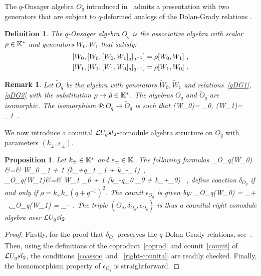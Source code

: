 \documentclass[11pt]{amsart}
\numberwithin{equation}{section}
\newtheorem{prop}[thm]{Proposition}
\newtheorem{defn}[thm]{Definition}
\newtheorem{rem}[thm]{Remark}
\numberwithin{equation}{section}
\begin{document}
The $q$-Onsager algebra $O_q$ introduced in~\cite{Ter93,Ter03,BK05} admits a presentation with two generators that are subject to $q$-deformed analogs of the Dolan-Grady relations \cite{DG}.
\begin{defn}\label{def:Oq} The $q$-Onsager algebra ${O}_q$ is the associative algebra with scalar $\rho\in{\mathbb{K}}^*$ and generators $W_0,W_1$ that satisfy:
\begin{align} \label{qDG1}
	\lbrack  {\normalfont W}_0, \lbrack {\normalfont W}_0, \lbrack {\normalfont W}_0, {\normalfont W}_1\rbrack_q \rbrack_{q^{-1}} \rbrack &=\rho \lbrack {\normalfont W}_0, {\normalfont W}_1 \rbrack\ ,\\ \label{qDG2}
	\lbrack {\normalfont W}_1, \lbrack {\normalfont W}_1, \lbrack {\normalfont W}_1, {\normalfont W}_0\rbrack_q \rbrack_{q^{-1}}\rbrack &= \rho  \lbrack {\normalfont W}_1, {\normalfont W}_0 \rbrack\ .
\end{align}   
\end{defn}
\begin{rem} Let $\tilde{O}_q$ be the algebra with generators $\tilde{W}_0,\tilde{W}_1$ and relations~\eqref{qDG1}, \eqref{qDG2} with the substitution $\rho \rightarrow \tilde\rho\in{\mathbb{K}}^*$.
The algebras $O_q$ and $\tilde O_q$  are isomorphic. The isomorphism $\Psi\colon O_q \rightarrow \tilde{O}_q$ is such that 
\beqa\label{eq:Psi}
\Psi(W_0)= \sqrt{\frac{\rho}{\tilde\rho}}_0, \qquad
\Psi(W_1)= \sqrt{\frac{\rho}{\tilde\rho}}_1\ .
\eeqa
\end{rem}

We now introduce  
a counital $\mathcal{L} U_q sl_2$-comodule algebra structure on $O_q$ with  parameters $(k_\pm,\varepsilon_\pm)$.


\begin{prop}\label{prop:coact} Let $k_\pm\in\mathbb{K}^*$ and $\varepsilon_\pm\in\mathbb{K}$. 
The following formulas
\beqa
	\delta_{O_q}(W_0) &=& W_0 \otimes \tk_1 + 1 \otimes (k_+q\te_1 \tk_1 + k_-\tf_1)\ ,\label{eq:del1}\\
	\delta_{O_q}(W_1)&=& W_1 \otimes \tk_0 +  1 \otimes(k_-q\te_0 \tk_0 + k_+\tf_0) \ ,\label{eq:del2}
\eeqa
define coaction $\delta_{O_q}$ if and only if
$\rho=k_+ k_-(q+q^{-1})^2$. 
The counit $\epsilon_{O_q}$ is given by:
\beqa
	\epsilon_{O_q}(W_0) = \varepsilon_+ \ ,\quad \epsilon_{O_q}(W_1) = \varepsilon_-\ .\label{eq:coun1}
\eeqa
The triple $(O_q,\delta_{O_q},\epsilon_{O_q})$ is thus a counital right comodule algebra over $\mathcal{L} U_q sl_2$.
\end{prop}
\begin{proof}
 Firstly, for the proof that $\delta_{O_q}$ preserves the $q$-Dolan-Grady relations, see~\cite[Prop.\,2.2]{BB09}. Then, using the definitions of the coproduct~\eqref{coprod} and counit~\eqref{counit} of $\mathcal{L} U_q sl_2$, the conditions~\eqref{coassoc} and ~\eqref{right-counital} are readily checked. Finally,  the homomorphism property of $\epsilon_{O_q}$ is straightforward.
\end{proof}
\end{document}
